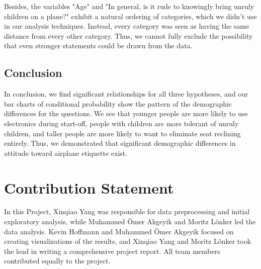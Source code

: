 \documentclass{article}
\theoremstyle{plain}
\theoremstyle{definition}
\theoremstyle{remark}
\begin{document}
Besides, the variables "Age" and "In general, is it rude to knowingly bring unruly children on a plane?" exhibit a natural ordering of categories, which we didn't use in our analysis techniques. Instead, every category was seen as having the same distance from every other category. Thus, we cannot fully exclude the possibility that even stronger statements could be drawn from the data.

\subsection{Conclusion}
In conclusion, we find significant relationships for all three hypotheses, and our bar charts of conditional probability show the pattern of the demographic differences for the questions. We see that younger people are more likely to use electronics during start-off, people with children are more tolerant of unruly children, and taller people are more likely to want to eliminate seat reclining entirely. Thus, we demonstrated that significant demographic differences in attitude toward airplane etiquette exist.

\section*{Contribution Statement}

In this Project, Xinqiao Yang was responsible for data preprocessing and initial exploratory analysis, while Muhammed \"Omer Akgeyik and Moritz L\"onker led the data analysis. Kevin Hoffmann and Muhammed \"Omer Akgeyik focused on creating visualizations of the results, and Xinqiao Yang and Moritz L\"onker took the lead in writing a comprehensive project report. All team members contributed equally to the project.






\end{document}
